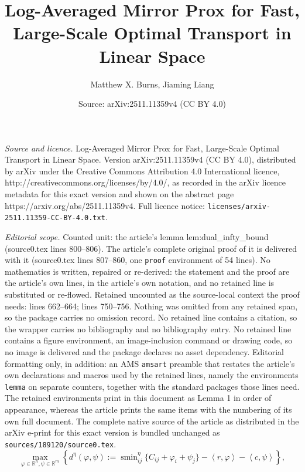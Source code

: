 \documentclass[10pt,a4paper]{amsart}
\title{Log-Averaged Mirror Prox for Fast, Large-Scale Optimal Transport in Linear Space}
\author{Matthew X. Burns, Jiaming Liang}
\date{Source: arXiv:2511.11359v4 (CC BY 4.0)}
\newcommand{\R}{\mathbb{R}}
\newcommand{\inner}[2]{\left\langle #1,#2\right\rangle}
\newcommand{\softmin}{\operatorname{smin}}
\begin{document}
\maketitle

\noindent\emph{Source and licence.} Log-Averaged Mirror Prox for Fast, Large-Scale Optimal Transport in Linear Space. Version arXiv:2511.11359v4 (CC BY 4.0), distributed by arXiv under the Creative Commons Attribution 4.0 International licence, http://creativecommons.org/licenses/by/4.0/, as recorded in the arXiv licence metadata for this exact version and shown on the abstract page https://arxiv.org/abs/2511.11359v4. Full licence notice: \texttt{licenses/arxiv-2511.11359-CC-BY-4.0.txt}.\par\smallskip

\noindent\textit{Editorial scope.} Counted unit: the article's lemma lem:dual\_infty\_bound (source0.tex lines 800--806). The article's complete original proof of it is delivered with it (source0.tex lines 807--860, one \texttt{proof} environment of 54 lines). No mathematics is written, repaired or re-derived: the statement and the proof are the article's own lines, in the article's own notation, and no retained line is substituted or re-flowed.  Retained uncounted as the source-local context the proof needs: lines 662--664; lines 750--756.  Nothing was omitted from any retained span, so the package carries no omission record.  No retained line contains a citation, so the wrapper carries no bibliography and no bibliography entry.  No retained line contains a figure environment, an image-inclusion command or drawing code, so no image is delivered and the package declares no asset dependency.  Editorial formatting only, in addition: an AMS \texttt{amsart} preamble that restates the article's own declarations and macros used by the retained lines, namely the environments \texttt{lemma} on separate counters, together with the standard packages those lines need.  The retained environments print in this document as Lemma 1 in order of appearance, whereas the article prints the same items with the numbering of its own full document.  The complete native source of the article as distributed in the arXiv e-print for this exact version is bundled unchanged as \texttt{sources/189120/source0.tex}.
\begin{equation}\label{def:dual_eot}
    \max_{\varphi\in\R^n,\psi\in\R^m} \left\{d^{\eta }(\varphi,\psi):=\softmin^{\eta }_{ij}\{C_{ij}+\varphi_i+\psi_j\}-\inner{r}{\varphi} - \inner{c}{\psi}\right\},
\end{equation}
\end{document}
